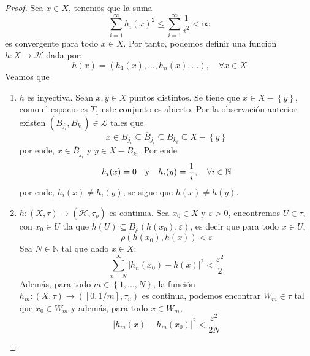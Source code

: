 \documentclass[12pt]{report}
\newcounter{it}
\theoremstyle{largebreak}
\newcommand\abs[1]{\ensuremath{\left|#1\right|}}
\newcommand\cf[3]{\ensuremath{#1:#2\rightarrow#3}}
\begin{document}
\begin{proof}
        Sea $x\in X$, tenemos que la suma
        \begin{equation*}
            \sum_{ i=1}^\infty h_i(x)^2\leq\sum_{ i=1}^\infty\frac{1}{i^2} <\infty
        \end{equation*}
        es convergente para todo $x\in X$. Por tanto, podemos definir una función $\cf{h}{X}{\mathcal{H}}$ dada por:
        \begin{equation*}
            h(x)=(h_1(x),...,h_n(x),...),\quad\forall x\in X
        \end{equation*}
        Veamos que
        \begin{enumerate}
            \item $h$ es inyectiva. Sean $x,y\in X$ puntos distintos. Se tiene que $x\in X-\left\{y\right\}$, como el espacio es $T_1$ este conjunto es abierto. Por la observación anterior existen $(B_{ j_i},B_{ k_i})\in\mathcal{L}$ tales que
            \begin{equation*}
                x\in B_{ j_i}\subseteq\overline{B}_{ j_i}\subseteq B_{ k_i}\subseteq X-\left\{y\right\}
            \end{equation*}
            por ende, $x\in\overline{B}_{ j_i}$ y $y\in X-B_{ k_i}$. Por ende
            \begin{equation*}
                h_i(x)=0\quad\textup{y}\quad h_i(y)=\frac{1}{i},\quad\forall i\in\mathbb{N}
            \end{equation*}
            por ende, $h_i(x)\neq h_i(y)$, se sigue que $h(x)\neq h(y)$.
            \item $\cf{h}{(X,\tau)}{(\mathcal{H},\tau_{\rho})}$ es continua. Sea $x_0\in X$ y $\varepsilon>0$, encontremos $U\in\tau$, con $x_0\in U$ tla que $h(U)\subseteq B_\rho(h(x_0),\varepsilon)$, es decir que para todo $x\in U$,
            \begin{equation*}
                \rho(h(x_0),h(x))<\varepsilon
            \end{equation*}
            Sea $N\in\mathbb{N}$ tal que dado $x\in X$:
            \begin{equation*}
                \sum_{ n=N}^\infty\abs{ h_n(x_0)-h(x)}^2<\frac{\varepsilon^2}{2}
            \end{equation*}
            Además, para todo $m\in\left\{1,...,N \right\}$, la función $\cf{h_m}{(X,\tau)}{([0,1/m],\tau_u)}$ es continua, podemos encontrar $W_m\in\tau$ tal que $x_0\in W_m$ y además, para todo $x\in W_m$,
            \begin{equation*}
                \abs{h_m(x)-h_m(x_0)}^2<\frac{\varepsilon^2}{2N}

\end{equation*}
\end{enumerate}
\end{proof}
\end{document}
